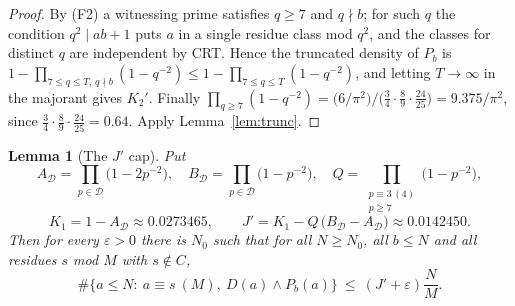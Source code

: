 \documentclass[11pt,a4paper]{article}
\theoremstyle{plain}
\newtheorem{lemma}[theorem]{Lemma}
\theoremstyle{definition}
\theoremstyle{remark}
\newcommand{\Dset}{\mathcal{D}}
\begin{document}
\begin{proof}
By (F2) a witnessing prime satisfies $q\ge 7$ and $q\nmid b$; for such $q$ the condition
$q^2\mid ab+1$ puts $a$ in a single residue class mod $q^2$, and the classes for distinct $q$ are
independent by CRT. Hence the truncated density of $P_b$ is
$1-\prod_{7\le q\le T,\,q\nmid b}(1-q^{-2})\le 1-\prod_{7\le q\le T}(1-q^{-2})$, and letting
$T\to\infty$ in the majorant gives $K_2'$. Finally
$\prod_{q\ge 7}(1-q^{-2})=\bigl(6/\pi^2\bigr)\big/\bigl(\tfrac34\cdot\tfrac89\cdot\tfrac{24}{25}\bigr)
=9.375/\pi^2$, since $\tfrac34\cdot\tfrac89\cdot\tfrac{24}{25}=0.64$.
Apply Lemma~\ref{lem:trunc}.
\end{proof}

\begin{lemma}[The $J'$ cap]\label{lem:J}
Put
\[
 A_{\Dset}=\prod_{p\in\Dset}\bigl(1-2p^{-2}\bigr),\quad
 B_{\Dset}=\prod_{p\in\Dset}\bigl(1-p^{-2}\bigr),\quad
 Q=\prod_{\substack{p\equiv 3\,(4)\\ p\ge 7}}\bigl(1-p^{-2}\bigr),
\]
\[
 K_1=1-A_{\Dset}\approx 0.0273465,\qquad
 J'=K_1-Q\,\bigl(B_{\Dset}-A_{\Dset}\bigr)\approx 0.0142450 .
\]
Then for every $\varepsilon>0$ there is $N_0$ such that for all $N\ge N_0$, all $b\le N$ and all
residues $s$ mod $M$ with $s\notin C$,
\[
 \#\{a\le N:\ a\equiv s\ (M),\ D(a)\wedge P_b(a)\}\ \le\ (J'+\varepsilon)\frac{N}{M}.
\]
\end{lemma}
\end{document}
